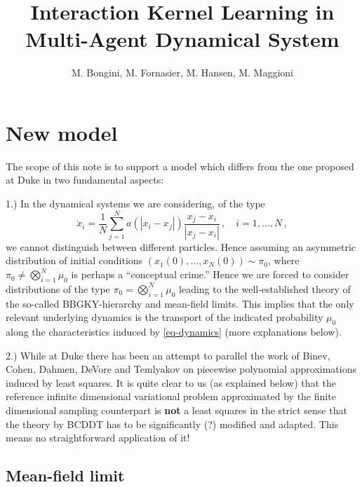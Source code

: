 \documentclass[A4paper,11pt]{article}
\title{Interaction Kernel Learning in Multi-Agent Dynamical System}
\author{M. Bongini, M. Fornasier, M. Hansen, M. Maggioni}
\date{}
\theoremstyle{definition}
\begin{document}
\maketitle

\bigskip


\section{New model}

The scope of this note is to support a model which differs from the one proposed at Duke in two fundamental aspects:

1.) In the dynamical systems we are considering, of the type
\begin{equation}\label{eq-dynamics}
	\dot x_i=\frac{1}{N}\sum_{j=1}^N a(|x_i-x_j|)\frac{x_j-x_i}{|x_j-x_i|}\,,\quad i=1,\ldots,N\,,
\end{equation}
we cannot distinguish between different particles. Hence assuming an asymmetric distribution of initial conditions $(x_1(0),\ldots,x_N(0))\sim\pi_0$, where $\pi_0\neq\bigotimes_{i=1}^N\mu_0$ is perhaps a ``conceptual crime.'' Hence we are forced to consider distributions of the type $\pi_0=\bigotimes_{i=1}^N\mu_0$ leading to the well-established theory of the so-called BBGKY-hierarchy and mean-field limits. This implies that the only relevant underlying dynamics is the transport of the indicated probability $\mu_0$ along the characteristics induced by \eqref{eq-dynamics} (more explanations below).

2.) While at Duke there has been an attempt to parallel the work of Binev, Cohen, Dahmen, DeVore and Temlyakov on piecewise polynomial approximations induced by least squares. It is quite clear to us (as explained below) that the reference infinite dimensional variational problem approximated by the finite dimensional sampling counterpart is {\bf not} a least squares in the strict sense that the theory by BCDDT has to be significantly (?) modified and adapted. This means no straightforward application of it!

\subsection{Mean-field limit}
\end{document}
